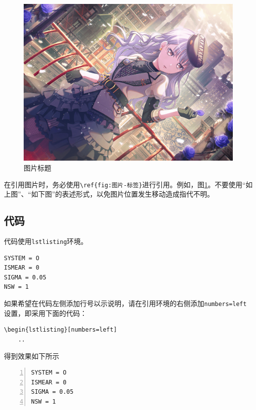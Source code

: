\begin{figure}
    \centering
    \includegraphics[width=1\linewidth]{fig.png}
    \caption{图片标题}
    \label{fig:图片-标签}
\end{figure}

\begin{attention}
    在引用图片时，务必使用\verb|\ref{fig:图片-标签}|进行引用。例如，图\ref{fig:图片-标签}。不要使用“如上图”、“如下图”的表述形式，以免图片位置发生移动造成指代不明。
\end{attention}

\subsection{代码}\label{subsec:关于如何编写模板（教程）-代码}

代码使用\verb|lstlisting|环境。

\begin{lstlisting}
SYSTEM = O
ISMEAR = 0
SIGMA = 0.05
NSW = 1
\end{lstlisting}

如果希望在代码左侧添加行号以示说明，请在引用环境的右侧添加\verb|numbers=left|设置，即采用下面的代码：

\begin{lstlisting}[frame=line]
\begin{lstlisting}[numbers=left]
    ..
\end{lstlisting}

得到效果如下所示

\begin{lstlisting}[numbers=left]
SYSTEM = O
ISMEAR = 0
SIGMA = 0.05
NSW = 1
\end{lstlisting}

